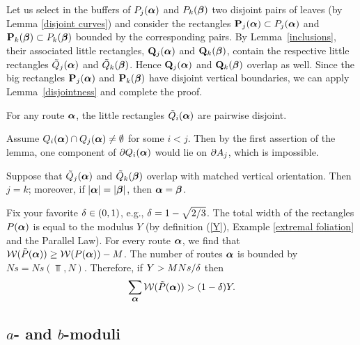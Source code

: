 \begin{pf}
 Let us select in the buffers of  $P_j({\mbox{\boldmath$\alpha$} })$ and $P_k({\mbox{\boldmath$\beta$} })$
two disjoint pairs of leaves (by Lemma \ref{disjoint curves})
and consider the rectangles 
${\bf P}_j({\mbox{\boldmath$\alpha$} })\subset P_j({\mbox{\boldmath$\alpha$} })$ and ${\bf P}_k({\mbox{\boldmath$\beta$} })\subset P_k({\mbox{\boldmath$\beta$} })$
bounded by the corresponding pairs. 
By Lemma~\ref{inclusions},  their associated little rectangles, ${\bf Q}_j({\mbox{\boldmath$\alpha$} })$ and ${\bf Q}_k({\mbox{\boldmath$\beta$} })$,
contain the respective little rectangles  $\tilde Q_j({\mbox{\boldmath$\alpha$} })$ and $\tilde Q_k({\mbox{\boldmath$\beta$} })$.
Hence ${\bf Q}_j({\mbox{\boldmath$\alpha$} })$ and ${\bf Q}_k({\mbox{\boldmath$\beta$} })$ overlap as well. 
Since the big rectangles ${\bf P}_j({\mbox{\boldmath$\alpha$} })$ and ${\bf P}_k({\mbox{\boldmath$\beta$} })$ have disjoint vertical boundaries,
we can apply Lemma~\ref{disjointness} and 
complete the proof. 
\end{pf}


\begin{cor}\label{same itinerary}
   For any route ${\mbox{\boldmath$\alpha$} }$, the little rectangles $\tilde Q_i({\mbox{\boldmath$\alpha$} })$ are pairwise disjoint.
\end{cor}

\begin{pf}
   Assume $Q_i({\mbox{\boldmath$\alpha$} })\cap Q_j({\mbox{\boldmath$\alpha$} })\not=\emptyset$ for some $i<j$.
Then by the first assertion of the lemma, one component of $\partial Q_i({\mbox{\boldmath$\alpha$} })$ would lie on
$\partial A_j$, which is impossible.  
\end{pf}


\begin{cor} \label{same height}
Suppose that $\tilde Q_j({\mbox{\boldmath$\alpha$} })$ and $\tilde Q_k({\mbox{\boldmath$\beta$} })$ overlap with matched vertical orientation.
Then $j = k$; 
moreover, if $|{\mbox{\boldmath$\alpha$} }|=|{\mbox{\boldmath$\beta$} }|$,
then ${\mbox{\boldmath$\alpha$} } = {\mbox{\boldmath$\beta$} }$.
\end{cor}



Fix your favorite ${\delta}\in (0,1)$, e.g., ${\delta}=1- \sqrt{2/3}$.
The total width of the rectangles $P({\mbox{\boldmath$\alpha$} })$ is equal to the modulus $Y$  
(by definition (\ref{Y}),  Example \ref{extremal foliation} and the Parallel Law).
For every route ${\mbox{\boldmath$\alpha$} }$,
we find that ${\cal W}(\tilde P({\mbox{\boldmath$\alpha$} })) \ge {\cal W}(P({\mbox{\boldmath$\alpha$} })) - M$.
The number of routes ${\mbox{\boldmath$\alpha$} }$ is bounded by $Ns=Ns(\Top, N)$.
Therefore,
if $Y >  M Ns/{\delta} $ then
\begin{equation}\label{tilde P}
     \sum_{\mbox{\small\boldmath$\alpha$} } {\cal W}(\tilde P ({\mbox{\boldmath$\alpha$} })) >  (1-{\delta}) Y.
\end{equation}

\subsection{$a$- and $b$-moduli}\label{forest}

